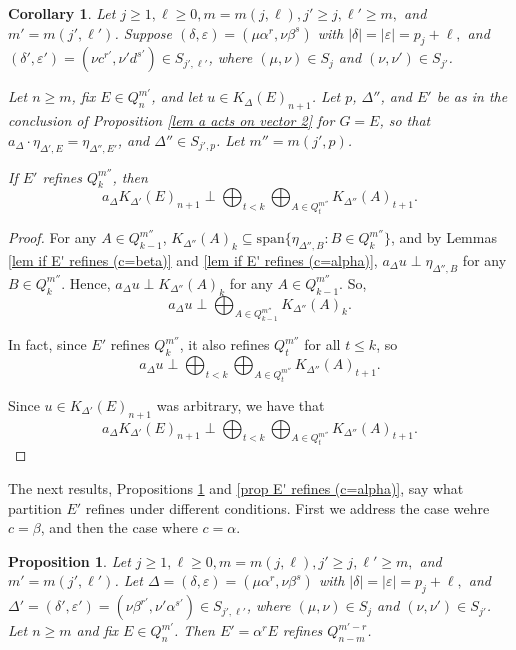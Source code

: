 \documentclass[12pt]{amsart}
\newcommand{\sse}{\subseteq}
\newcommand{\spn}{\text{span}}
\newcommand{\al}{\alpha}
\newcommand{\be}{\beta}
\newcommand{\de}{\delta}
\newcommand{\De}{\Delta}
\newcommand{\ep}{\varepsilon}
\theoremstyle{plain} %
\newtheorem{Proposition}[Theorem]{Proposition}
\newtheorem{Corollary}[Theorem]{Corollary}
\theoremstyle{definition} %
\begin{document}
\begin{Corollary}\label{coro if E' refines}
Let $j \geq 1, \ell \geq 0, m = m(j,\ell), j' \geq j, \ell' \ge m,$ and $m' = m(j', \ell')$.
    Suppose $(\de, \ep) = (\mu\al^r, \nu\be^s) $ with $|\de| = |\ep| = p_j + \ell,$ and $(\de', \ep') = (\nu c^{r'}, \nu'd^{s'}) \in S_{j', \ell'}$, where $(\mu,\nu) \in S_j$ and $(\nu,\nu') \in S_{j'}$. %

    Let $n \geq m$, fix $E \in Q_n^{m'}$, and let $u \in K_{\De}(E)_{n+1}$. Let $p$, $\De''$, and $E'$ be as in the conclusion of Proposition \ref{lem a acts on vector 2} for $G=E$, so that $a_{\De} \cdot \eta_{\De', E} = \eta_{\De'', E'}$, and $\De''\in S_{j',p}$. Let $m'' = m(j', p)$.
    
    If $E'$ refines $Q_k^{m''}$, then $$a_{\De} K_{\De'}(E)_{n+1} \perp \bigoplus_{t < k} \bigoplus_{A \in Q_t^{m''}} K_{\De''}(A)_{t+1}.$$
\end{Corollary}
\begin{proof}
    For any $A \in Q_{k-1}^{m''}$, $K_{\De''}(A)_k \sse \spn\{\eta_{\De'',B} : B \in Q_k^{m''}\}$, and by Lemmas \ref{lem if E' refines (c=beta)} and \ref{lem if E' refines (c=alpha)}, $a_{\De} u \perp \eta_{\De'',B}$ for any $B \in Q_k^{m''}$. Hence, $a_{\De} u \perp K_{\De''}(A)_k$ for any $A \in Q_{k-1}^{m''}$. So, $$a_{\De} u \perp \bigoplus_{A \in Q_{k-1}^{m''} } K_{\De''}(A)_k.$$
    
    In fact, since $E'$ refines $Q_k^{m''}$, it also refines $Q_t^{m''}$ for all $t \leq k$, so 
    $$a_{\De} u \perp \bigoplus_{t<k} \bigoplus_{A \in Q_{t}^{m''} } K_{\De''}(A)_{t+1}.$$
    
    Since $u \in K_{\De'}(E)_{n+1}$ was arbitrary, we have that
    $$a_{\De} K_{\De'}(E)_{n+1} \perp \bigoplus_{t<k} \bigoplus_{A \in Q_{t}^{m''} } K_{\De''}(A)_{t+1}.$$
\end{proof}

 The next results,  Propositions \ref{prop E' refines (c=beta)} and \ref{prop E' refines (c=alpha)}, say what partition $E'$ refines under different conditions. First we address the case wehre $c = \beta$, and then the case where $c = \al$.

\begin{Proposition}\label{prop E' refines (c=beta)}
    Let $j \geq 1, \ell \geq 0, m = m(j,\ell), j' \geq j, \ell' \ge m,$ and $m' = m(j', \ell')$. Let $\De = (\de, \ep) =(\mu\al^r, \nu\be^s) $ with $|\de| = |\ep| = p_j + \ell,$ and $\De' = (\de', \ep') = (\nu\be^{r'}, \nu' \al^{s'}) \in S_{j',\ell'}$, where $(\mu, \nu) \in S_j$ and $(\nu, \nu') \in S_{j'}$. Let $n \geq m$ and fix $E \in Q_n^{m'}$. Then $E' = \al^r E$ refines $Q_{n-m}^{m'-r}$.
\end{Proposition}
\end{document}
